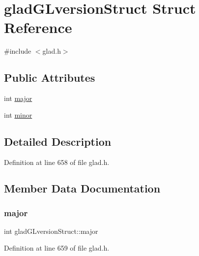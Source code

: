 \hypertarget{structglad_g_lversion_struct}{}\section{glad\+G\+Lversion\+Struct Struct Reference}
\label{structglad_g_lversion_struct}


{\ttfamily \#include $<$glad.\+h$>$}

\subsection*{Public Attributes}
\begin{DoxyCompactItemize}
\item 
int \mbox{\hyperlink{structglad_g_lversion_struct_ac7f9db11d2679df12ef0313b728554db}{major}}
\item 
int \mbox{\hyperlink{structglad_g_lversion_struct_acc2bff1c8966c6866f2ad6f5a4e475b2}{minor}}
\end{DoxyCompactItemize}


\subsection{Detailed Description}


Definition at line 658 of file glad.\+h.



\subsection{Member Data Documentation}
\mbox{\label{structglad_g_lversion_struct_ac7f9db11d2679df12ef0313b728554db}} 
\subsubsection{\texorpdfstring{major}{major}}
{\footnotesize\ttfamily int glad\+G\+Lversion\+Struct\+::major}



Definition at line 659 of file glad.\+h.

\mbox{\label{structglad_g_lversion_struct_acc2bff1c8966c6866f2ad6f5a4e475b2}} 
